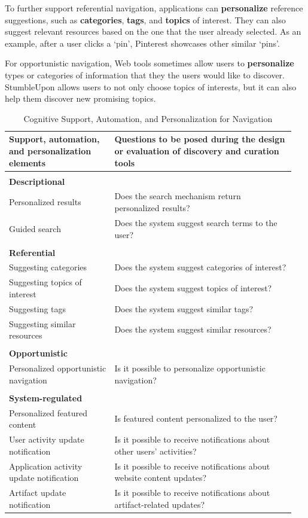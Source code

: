 \documentclass{sigchi}
\begin{document}
{{{To further support referential navigation, applications can \textbf{personalize} reference suggestions, such as \textbf{categories}, \textbf{tags}, and \textbf{topics} of interest. They can also suggest relevant resources based on the one that the user already selected. As an example, after a user clicks a `pin', Pinterest showcases other similar `pins'.

For opportunistic navigation, Web tools sometimes allow users to \textbf{personalize} types or categories of information that they the users would like to discover. StumbleUpon allows users to not only choose topics of interests, but it can also help them discover new promising topics.

\begin{table}[ht!]
\caption{Cognitive Support, Automation, and Personalization for Navigation}
\label{table:navigation_support}
\begin{tabular}{|p{0.35\linewidth}|p{0.60\linewidth}|}
\hline
Support, automation, and personalization elements & Questions to be posed during the design or evaluation of discovery and curation tools \\
\hline
& \\
\textbf{Descriptional}       & \\
Personalized results         & Does the search mechanism return personalized results? \\
Guided search                & Does the system suggest search terms to the user? \\
& \\
\textbf{Referential}         & \\
Suggesting categories & Does the system suggest categories of interest? \\
Suggesting topics of interest & Does the system suggest topics of interest? \\
Suggesting tags              & Does the system suggest similar tags? \\
Suggesting similar resources & Does the system suggest similar resources? \\
& \\
\textbf{Opportunistic} & \\
Personalized opportunistic navigation     & Is it possible to personalize opportunistic navigation? \\
& \\
\textbf{System-regulated} & \\
Personalized featured content         & Is featured content personalized to the user? \\                                                       
User activity update notification & Is it possible to receive notifications about other users' activities? \\
Application activity update notification & Is it possible to receive notifications about website content updates?\\
Artifact update notification & Is it possible to receive notifications about artifact-related updates? \\                                                       
\hline


\end{tabular}
\end{table}}}}
\end{document}
